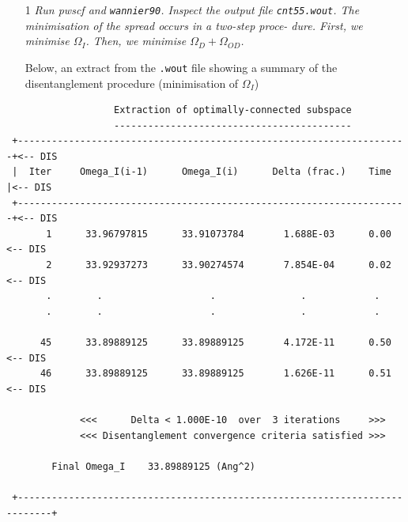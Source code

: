 \begin{itemize}
\item[1] {\it Run pwscf and {\tt wannier90}. Inspect the output file {\tt cnt55.wout}. The minimisation of the spread occurs in a two-step proce-
dure. First, we minimise $\Omega_I$. Then, we minimise $\Omega_D + \Omega_{OD}$.}

Below, an extract from the {\tt .wout} file showing a summary of the disentanglement procedure (minimisation of $\Omega_I$)
\end{itemize}
\begin{tcolorbox}[floatplacement=h!,float,nobeforeafter,sharp corners,boxrule=0.5pt]
\small{
	\begin{verbatim}
                   Extraction of optimally-connected subspace
                   ------------------------------------------
 +---------------------------------------------------------------------+<-- DIS
 |  Iter     Omega_I(i-1)      Omega_I(i)      Delta (frac.)    Time   |<-- DIS
 +---------------------------------------------------------------------+<-- DIS
       1      33.96797815      33.91073784       1.688E-03      0.00    <-- DIS
       2      33.92937273      33.90274574       7.854E-04      0.02    <-- DIS
       .		.					.				.			 .
       .		.					.				.			 .

      45      33.89889125      33.89889125       4.172E-11      0.50    <-- DIS
      46      33.89889125      33.89889125       1.626E-11      0.51    <-- DIS

             <<<      Delta < 1.000E-10  over  3 iterations     >>>
             <<< Disentanglement convergence criteria satisfied >>>

        Final Omega_I    33.89889125 (Ang^2)

 +----------------------------------------------------------------------------+
	\end{verbatim}
}
\end{tcolorbox}

